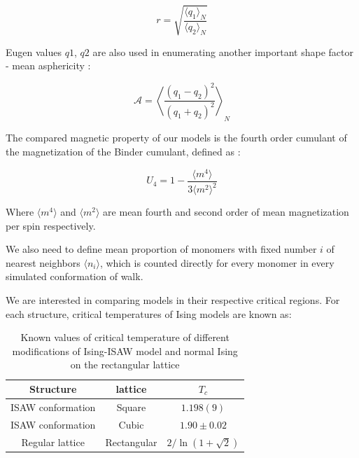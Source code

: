 \documentclass[aps,pre,amssymb,amsmath,twocolumn,floatfix]{revtex4-2}
\begin{document}
\begin{equation}
    r = \sqrt{\frac{\langle q_{1}\rangle_{N}}{\langle q_{2} \rangle_{N}}}
\end{equation}

Eugen values $q1$, $q2$ are also used in enumerating another important shape factor - mean asphericity \cite{Caracciolo2011}:

\begin{equation}
\label{eq:Asphericity}
    \mathcal{A} = \left\langle \frac{(q_{1} - q_{2})^{2}}{(q_{1} + q_{2})^{2}} \right\rangle_{N}
\end{equation}

The compared magnetic property of our models is the fourth order cumulant of the magnetization of the Binder cumulant, defined as \cite{Binder1981_Ising}:

\begin{equation}
\label{eq:Cumulant}
U_{4} = 1 - \frac{\langle m^{4} \rangle}{3 \langle m^{2} \rangle^{2}}
\end{equation}

Where $\langle m^{4} \rangle$ and $\langle m^{2} \rangle$ are mean fourth and second order of mean magnetization per spin respectively.

We also need to define mean proportion of monomers with fixed number $i$ of nearest neighbors $\langle n_{i} \rangle$, which is counted directly for every monomer in every simulated conformation of walk.

We are interested in comparing models in their respective critical regions. For each structure, critical temperatures of Ising models are known as:

\begin{table}[h]
    \centering
    \begin{tabular}{|c|c|c|}
        \hline
        Structure & lattice & $T_{c}$ \\ \hline
        ISAW conformation & Square & $1.198(9)$\cite{faizullina2021critical} \\ \hline
        ISAW conformation & Cubic & $1.90 \pm 0.02$\cite{Foster2021}\\ \hline
        Regular lattice & Rectangular & $2/\ln{(1 + \sqrt{2})}$\cite{Onsager}\\ \hline
    \end{tabular}
    \caption{Known values of critical temperature of different modifications of Ising-ISAW model and normal Ising on the rectangular lattice}
    \label{tab:Ising_T_c}
\end{table}
\end{document}
